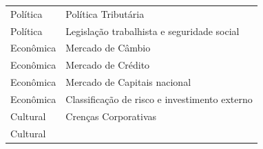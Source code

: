 \begin{longtable}[]{@{}
  >{\raggedright\arraybackslash}p{}
  >{\raggedright\arraybackslash}p{}@{}}
\begin{minipage}[b]{\linewidth}
Política
\end{minipage} & \begin{minipage}[b]{\linewidth}\raggedright
Política Tributária
\end{minipage} \\
\begin{minipage}[b]{\linewidth}\raggedright
Política
\end{minipage} & \begin{minipage}[b]{\linewidth}\raggedright
Legislação trabalhista e seguridade social
\end{minipage} \\
\begin{minipage}[b]{\linewidth}\raggedright
Econômica
\end{minipage} & \begin{minipage}[b]{\linewidth}\raggedright
Mercado de Câmbio
\end{minipage} \\
\begin{minipage}[b]{\linewidth}\raggedright
Econômica
\end{minipage} & \begin{minipage}[b]{\linewidth}\raggedright
Mercado de Crédito
\end{minipage} \\
\begin{minipage}[b]{\linewidth}\raggedright
Econômica
\end{minipage} & \begin{minipage}[b]{\linewidth}\raggedright
Mercado de Capitais nacional
\end{minipage} \\
\begin{minipage}[b]{\linewidth}\raggedright
Econômica
\end{minipage} & \begin{minipage}[b]{\linewidth}\raggedright
Classificação de risco e investimento externo
\end{minipage} \\
\begin{minipage}[b]{\linewidth}\raggedright
Cultural
\end{minipage} & \begin{minipage}[b]{\linewidth}\raggedright
Crenças Corporativas
\end{minipage} \\
\begin{minipage}[b]{\linewidth}\raggedright
Cultural
\end{minipage} & \begin{minipage}[b]{\linewidth}\raggedright

\end{minipage}
\end{longtable}
